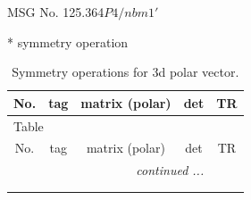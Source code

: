 \documentclass[fleqn,8pt]{jsarticle}
\begin{document}
\setcounter{MaxMatrixCols}{32}

\renewcommand{\tablename}{Table~}
\renewcommand{\figurename}{Figure~}
\begin{center}
\LARGE
MSG No. 125.364\quad$P4/nbm1'$
\end{center}
* symmetry operation
\renewcommand{\arraystretch}{1.3}
\begin{longtable}{ccccc}
\caption{Symmetry operations for 3d polar vector.}
 \\
 \hline \hline
No. & tag & matrix (polar) & det & TR \\ \hline \endfirsthead

\multicolumn{4}{l}{\tablename\ \thetable{}} \\
 \hline \hline
No. & tag & matrix (polar) & det & TR \\ \hline \endhead

 \hline \hline
\multicolumn{4}{r}{\footnotesize\it continued ...} \\ \endfoot

 \hline \hline
\multicolumn{4}{r}{} \\ \endlastfoot


\end{longtable}
\end{document}
